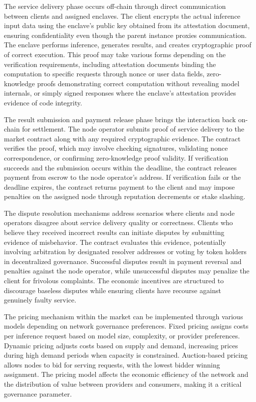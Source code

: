 The service delivery phase occurs off-chain through direct communication between clients and assigned enclaves. The client encrypts the actual inference input data using the enclave's public key obtained from its attestation document, ensuring confidentiality even though the parent instance proxies communication. The enclave performs inference, generates results, and creates cryptographic proof of correct execution. This proof may take various forms depending on the verification requirements, including attestation documents binding the computation to specific requests through nonce or user data fields, zero-knowledge proofs demonstrating correct computation without revealing model internals, or simply signed responses where the enclave's attestation provides evidence of code integrity.

The result submission and payment release phase brings the interaction back on-chain for settlement. The node operator submits proof of service delivery to the market contract along with any required cryptographic evidence. The contract verifies the proof, which may involve checking signatures, validating nonce correspondence, or confirming zero-knowledge proof validity. If verification succeeds and the submission occurs within the deadline, the contract releases payment from escrow to the node operator's address. If verification fails or the deadline expires, the contract returns payment to the client and may impose penalties on the assigned node through reputation decrements or stake slashing.

The dispute resolution mechanisms address scenarios where clients and node operators disagree about service delivery quality or correctness. Clients who believe they received incorrect results can initiate disputes by submitting evidence of misbehavior. The contract evaluates this evidence, potentially involving arbitration by designated resolver addresses or voting by token holders in decentralized governance. Successful disputes result in payment reversal and penalties against the node operator, while unsuccessful disputes may penalize the client for frivolous complaints. The economic incentives are structured to discourage baseless disputes while ensuring clients have recourse against genuinely faulty service.

The pricing mechanism within the market can be implemented through various models depending on network governance preferences. Fixed pricing assigns costs per inference request based on model size, complexity, or provider preferences. Dynamic pricing adjusts costs based on supply and demand, increasing prices during high demand periods when capacity is constrained. Auction-based pricing allows nodes to bid for serving requests, with the lowest bidder winning assignment. The pricing model affects the economic efficiency of the network and the distribution of value between providers and consumers, making it a critical governance parameter.

